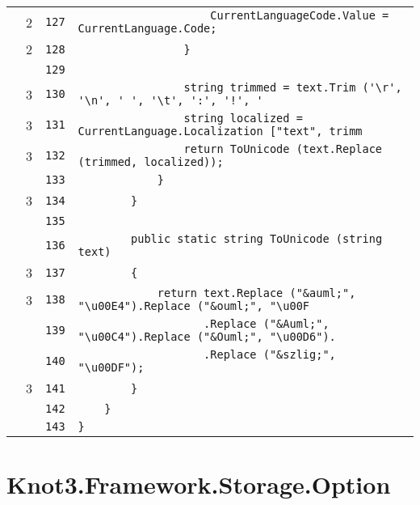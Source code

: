 \documentclass[a4paper,10pt]{article}
\begin{document}
\begin{longtable}[l]{lrrl}
\cellcolor{green} & 2 & \verb~127~ & \verb~                    CurrentLanguageCode.Value = CurrentLanguage.Code;~\\
\cellcolor{green} & 2 & \verb~128~ & \verb~                }~\\
\cellcolor{gray} &  & \verb~129~ & \verb~~\\
\cellcolor{green} & 3 & \verb~130~ & \verb~                string trimmed = text.Trim ('\r', '\n', ' ', '\t', ':', '!', '~\\
\cellcolor{green} & 3 & \verb~131~ & \verb~                string localized = CurrentLanguage.Localization ["text", trimm~\\
\cellcolor{green} & 3 & \verb~132~ & \verb~                return ToUnicode (text.Replace (trimmed, localized));~\\
\cellcolor{gray} &  & \verb~133~ & \verb~            }~\\
\cellcolor{green} & 3 & \verb~134~ & \verb~        }~\\
\cellcolor{gray} &  & \verb~135~ & \verb~~\\
\cellcolor{gray} &  & \verb~136~ & \verb~        public static string ToUnicode (string text)~\\
\cellcolor{green} & 3 & \verb~137~ & \verb~        {~\\
\cellcolor{green} & 3 & \verb~138~ & \verb~            return text.Replace ("&auml;", "\u00E4").Replace ("&ouml;", "\u00F~\\
\cellcolor{gray} &  & \verb~139~ & \verb~                   .Replace ("&Auml;", "\u00C4").Replace ("&Ouml;", "\u00D6").~\\
\cellcolor{gray} &  & \verb~140~ & \verb~                   .Replace ("&szlig;", "\u00DF");~\\
\cellcolor{green} & 3 & \verb~141~ & \verb~        }~\\
\cellcolor{gray} &  & \verb~142~ & \verb~    }~\\
\cellcolor{gray} &  & \verb~143~ & \verb~}~\\
\end{longtable}
\newpage
\section{Knot3.Framework.Storage.Option}
\end{document}
